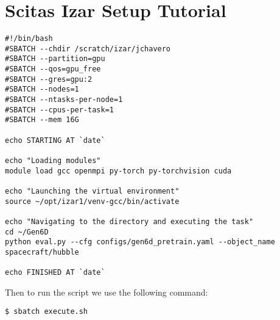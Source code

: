 \chapter{Scitas Izar Setup Tutorial}

\begin{lstlisting}[style=bashstyle, caption={Bash script \texttt{execute.sh} to run a machine learning model on Scitas Izar EPFL. While the overall structure remains consistent, this script is specific to Gen6D's architecture, further discussed later.}]
#!/bin/bash
#SBATCH --chdir /scratch/izar/jchavero
#SBATCH --partition=gpu
#SBATCH --qos=gpu_free
#SBATCH --gres=gpu:2
#SBATCH --nodes=1
#SBATCH --ntasks-per-node=1
#SBATCH --cpus-per-task=1
#SBATCH --mem 16G

echo STARTING AT `date`

echo "Loading modules"
module load gcc openmpi py-torch py-torchvision cuda

echo "Launching the virtual environment"
source ~/opt/izar1/venv-gcc/bin/activate

echo "Navigating to the directory and executing the task"
cd ~/Gen6D                                    
python eval.py --cfg configs/gen6d_pretrain.yaml --object_name spacecraft/hubble

echo FINISHED AT `date`
\end{lstlisting}

\noindent Then to run the script we use the following command:
\begin{lstlisting}[style=bashstyle, caption=Linux command to run the bash script.]
	$ sbatch execute.sh
\end{lstlisting}





\cleardoublepage{}